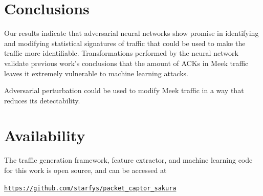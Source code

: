 \section{Conclusions}
Our results indicate that adversarial neural networks show promise in identifying and modifying statistical signatures of traffic that could be used to make the traffic more identifiable. Transformations performed by the neural network validate previous work's conclusions that the amount of ACKs in Meek traffic leaves it extremely vulnerable to machine learning attacks.

Adversarial perturbation could be used to modify Meek traffic in a way that reduces its detectability.
\section*{Availability}
The traffic generation framework, feature extractor, and machine learning code for this work is open source, and can be accessed at

\href{https://github.com/starfys/packet_captor_sakura}{\texttt{https://github.com/starfys/packet\_captor\_sakura}}





